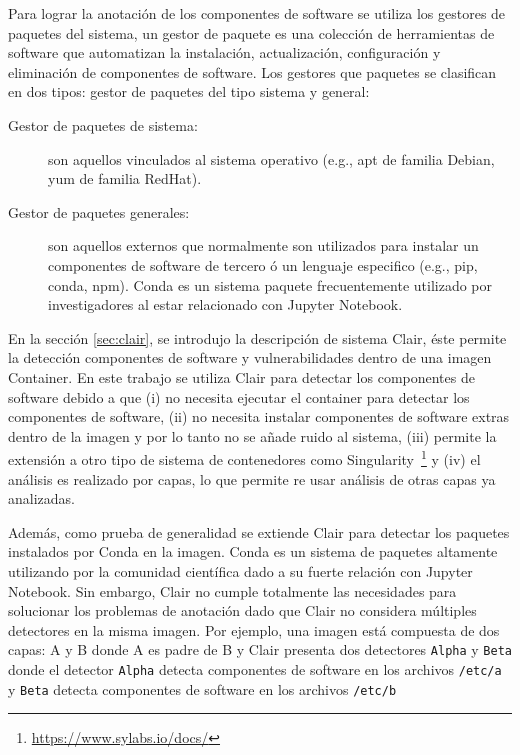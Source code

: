 Para lograr la anotación de los componentes de software se utiliza los gestores de paquetes del sistema, un gestor de paquete es una colección de herramientas de software que automatizan la instalación, actualización, configuración y eliminación de componentes de software. 
Los gestores que paquetes se clasifican en dos tipos: gestor de paquetes del tipo sistema y general:

\begin{description}
	\item  [Gestor de paquetes de sistema:] son aquellos vinculados al sistema operativo (e.g., apt de familia Debian, yum de familia RedHat).
	\item [Gestor de paquetes generales:] son aquellos externos que normalmente son utilizados para instalar un componentes de software de tercero ó un lenguaje especifico (e.g., pip, conda, npm). Conda es un sistema paquete frecuentemente utilizado por investigadores al estar relacionado con Jupyter Notebook.
\end{description}

En la sección \ref{sec:clair}, se introdujo la descripción de sistema Clair, éste permite la detección componentes de software y vulnerabilidades dentro de una imagen Container.
En este trabajo se utiliza Clair para detectar los componentes de software debido a que (i) no necesita ejecutar el container para detectar los componentes de software, (ii) no necesita instalar componentes de software extras dentro de la imagen y por lo tanto no se añade ruido al sistema, (iii) permite la extensión a otro tipo de sistema de contenedores como Singularity~\cite{kurtzer2017singularity}\footnote{\url{https://www.sylabs.io/docs/}} y (iv) el análisis es realizado por capas, lo que permite re usar análisis de otras capas ya analizadas.

Además, como prueba de generalidad se extiende Clair para detectar los paquetes instalados por Conda en la imagen.  Conda es un sistema de paquetes altamente utilizando por la comunidad científica dado a su fuerte relación con Jupyter Notebook.
Sin embargo, Clair no cumple totalmente las necesidades para solucionar los problemas de anotación dado que Clair no considera múltiples detectores en la misma imagen.
Por ejemplo, una imagen está compuesta de dos capas: A y B donde A es padre de B y Clair presenta dos detectores  \texttt{Alpha} y \texttt{Beta} donde el detector  \texttt{Alpha} detecta componentes de software en los archivos \verb|/etc/a| y  \texttt{Beta} detecta componentes de software en los archivos \verb|/etc/b|

